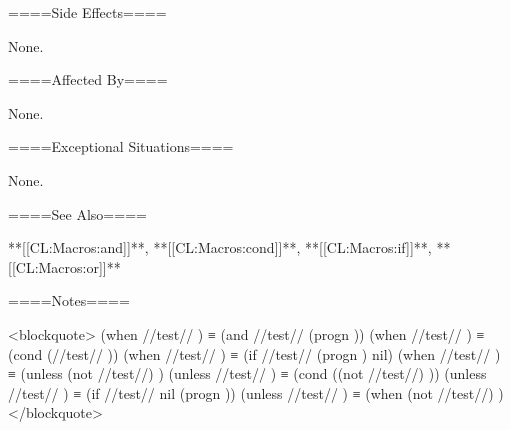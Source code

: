 ====Side Effects====

None.

====Affected By====

None.

====Exceptional Situations====

None.

====See Also====

**[[CL:Macros:and]]**, **[[CL:Macros:cond]]**, **[[CL:Macros:if]]**, **[[CL:Macros:or]]**

====Notes====

<blockquote> (when //test// ) ≡ (and //test// (progn )) (when //test// ) ≡ (cond (//test// )) (when //test// ) ≡ (if //test// (progn ) nil) (when //test// ) ≡ (unless (not //test//) ) (unless //test// ) ≡ (cond ((not //test//) )) (unless //test// ) ≡ (if //test// nil (progn )) (unless //test// ) ≡ (when (not //test//) ) </blockquote>

